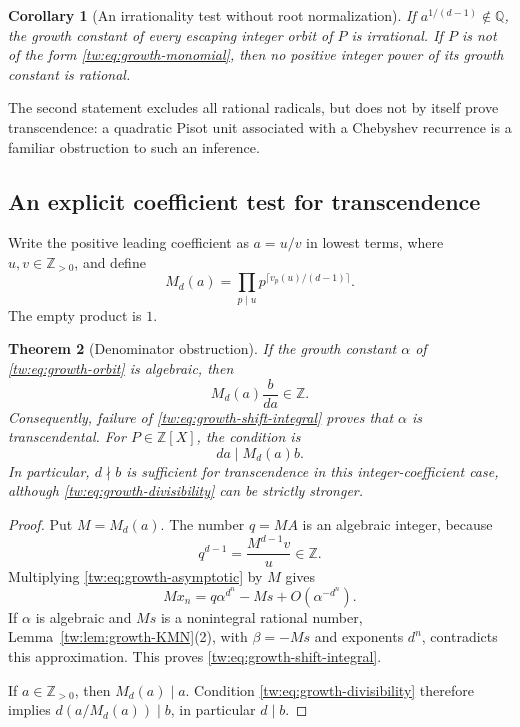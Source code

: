 \documentclass[11pt,a4paper]{article}
\newtheorem{theorem}{Theorem}[section]
\newtheorem{corollary}[theorem]{Corollary}
\theoremstyle{definition}
\theoremstyle{remark}
\numberwithin{equation}{section}
\begin{document}
\begin{corollary}[An irrationality test without root normalization]
If $a^{1/(d-1)}\notin\mathbb Q$, the growth constant of every
escaping integer orbit of $P$ is irrational.
If $P$ is not of the form \eqref{tw:eq:growth-monomial}, then no positive
integer power of its growth constant is rational.
\end{corollary}

The second statement excludes all rational radicals, but does not by
itself prove transcendence: a quadratic Pisot unit associated with a
Chebyshev recurrence is a familiar obstruction to such an inference.

\subsection{An explicit coefficient test for transcendence}

Write the positive leading coefficient as $a=u/v$ in lowest terms,
where $u,v\in\mathbb Z_{>0}$, and define
\begin{equation}\label{tw:eq:growth-M}
 M_d(a)=\prod_{p\mid u}p^{\lceil v_p(u)/(d-1)\rceil}.
\end{equation}
The empty product is $1$.

\begin{theorem}[Denominator obstruction]\label{tw:thm:growth-denominator}
If the growth constant $\alpha$ of \eqref{tw:eq:growth-orbit} is
algebraic, then
\begin{equation}\label{tw:eq:growth-shift-integral}
 M_d(a)\frac{b}{da}\in\mathbb Z.
\end{equation}
Consequently, failure of \eqref{tw:eq:growth-shift-integral} proves
that $\alpha$ is transcendental.
For $P\in\mathbb Z[X]$, the condition is
\begin{equation}\label{tw:eq:growth-divisibility}
 da\mid M_d(a)b.
\end{equation}
In particular, $d\nmid b$ is sufficient for transcendence in this
integer-coefficient case, although \eqref{tw:eq:growth-divisibility}
can be strictly stronger.
\end{theorem}

\begin{proof}
Put $M=M_d(a)$.  The number $q=MA$ is an algebraic integer, because
\[
 q^{d-1}=\frac{M^{d-1}v}{u}\in\mathbb Z.
\]
Multiplying \eqref{tw:eq:growth-asymptotic} by $M$ gives
\[
 Mx_n=q\alpha^{d^n}-Ms+O(\alpha^{-d^n}).
\]
If $\alpha$ is algebraic and $Ms$ is a nonintegral rational number,
Lemma~\ref{tw:lem:growth-KMN}(2), with $\beta=-Ms$ and exponents
$d^n$, contradicts this approximation.  This proves
\eqref{tw:eq:growth-shift-integral}.

If $a\in\mathbb Z_{>0}$, then $M_d(a)\mid a$.
Condition \eqref{tw:eq:growth-divisibility} therefore implies
$d(a/M_d(a))\mid b$, in particular $d\mid b$.
\end{proof}
\end{document}
